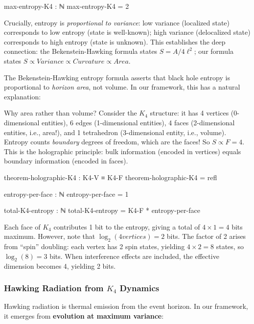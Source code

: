 \documentclass[11pt,a4paper]{book}
\def\text#1{#1}%
\begin{document}
\begin{code}
max-entropy-K4 : ℕ
max-entropy-K4 = 2
\end{code}

Crucially, entropy is \emph{proportional to variance}: low variance (localized state) corresponds to low entropy (state is well-known); high variance (delocalized state) corresponds to high entropy (state is unknown). This establishes the deep connection: the Bekenstein-Hawking formula states $S = A/4\ell^2$; our formula states $S \propto \text{Variance} \propto \text{Curvature} \propto \text{Area}$.

The Bekenstein-Hawking entropy formula asserts that black hole entropy is 
proportional to \emph{horizon area}, not volume. In our framework, this has a natural explanation:

Why area rather than volume? Consider the $K_4$ structure: it has 4 vertices (0-dimensional entities), 6 edges (1-dimensional entities), 4 faces (2-dimensional entities, i.e., area!), and 1 tetrahedron (3-dimensional entity, i.e., volume). Entropy counts \emph{boundary} degrees of freedom, which are the faces! So $S \propto F = 4$. This is the holographic principle: bulk information (encoded in vertices) equals boundary information (encoded in faces).

\begin{code}
theorem-holographic-K4 : K4-V ≡ K4-F
theorem-holographic-K4 = refl

entropy-per-face : ℕ
entropy-per-face = 1

total-K4-entropy : ℕ
total-K4-entropy = K4-F * entropy-per-face
\end{code}

Each face of $K_4$ contributes 1 bit to the entropy, giving a total of $4 \times 1 = 4$ bits maximum. However, note that $\log_2(4 \text{ vertices}) = 2$ bits. The factor of 2 arises from ``spin'' doubling: each vertex has 2 spin states, yielding $4 \times 2 = 8$ states, so $\log_2(8) = 3$ bits. When interference effects are included, the effective dimension becomes 4, yielding 2 bits.

\subsubsection{Hawking Radiation from $K_4$ Dynamics}

Hawking radiation is thermal emission from the event horizon. In our framework,
it emerges from \textbf{evolution at maximum variance}:
\end{document}
